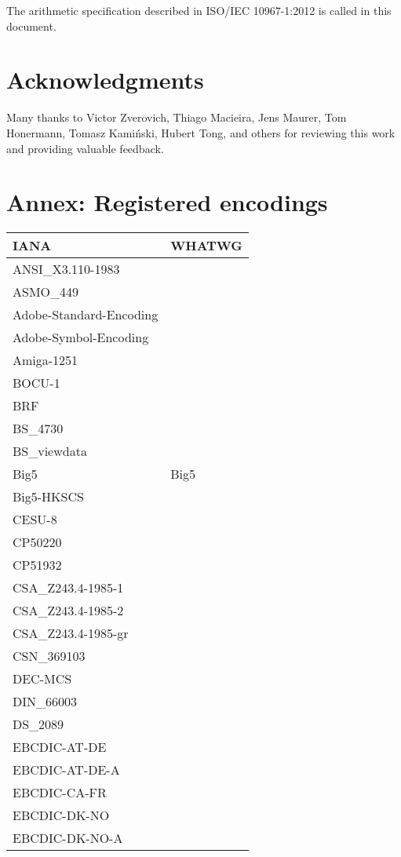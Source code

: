 \documentclass{wg21}
\begin{document}
The arithmetic specification described in ISO/IEC 10967-1:2012 is
called  in this document.


\section{Acknowledgments}

Many thanks to Victor Zverovich, Thiago Macieira, Jens Maurer, Tom Honermann, Tomasz Kamiński, Hubert Tong,  and others for reviewing this work and providing valuable feedback.


\section{Annex: Registered encodings}
\begin{longtable}{| p{} | p{} |}
\hline
\textbf{IANA} & \textbf{WHATWG} \\ \hline
\hline
ANSI_X3.110-1983 & \\ \hline
ASMO_449 & \\ \hline
Adobe-Standard-Encoding & \\ \hline
Adobe-Symbol-Encoding & \\ \hline
Amiga-1251 & \\ \hline
BOCU-1 & \\ \hline
BRF & \\ \hline
BS_4730 & \\ \hline
BS_viewdata & \\ \hline
Big5 & Big5\\ \hline
Big5-HKSCS & \\ \hline
CESU-8 & \\ \hline
CP50220 & \\ \hline
CP51932 & \\ \hline
CSA_Z243.4-1985-1 & \\ \hline
CSA_Z243.4-1985-2 & \\ \hline
CSA_Z243.4-1985-gr & \\ \hline
CSN_369103 & \\ \hline
DEC-MCS & \\ \hline
DIN_66003 & \\ \hline
DS_2089 & \\ \hline
EBCDIC-AT-DE & \\ \hline
EBCDIC-AT-DE-A & \\ \hline
EBCDIC-CA-FR & \\ \hline
EBCDIC-DK-NO & \\ \hline
EBCDIC-DK-NO-A & \\ \hline

\end{longtable}
\end{document}
